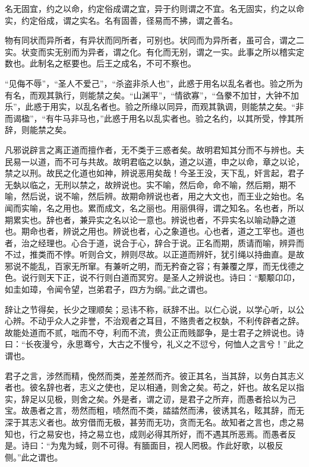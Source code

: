 \documentclass[]{article}
\begin{document}
名无固宜，约之以命，约定俗成谓之宜，异于约则谓之不宜。名无固实，约之以命实，约定俗成，谓之实名。名有固善，径易而不拂，谓之善名。

物有同状而异所者，有异状而同所者，可别也。状同而为异所者，虽可合，谓之二实。状变而实无别而为异者，谓之化。有化而无别，谓之一实。此事之所以稽实定数也。此制名之枢要也。后王之成名，不可不察也。

``见侮不辱''，``圣人不爱己''，``杀盗非杀人也''，此惑于用名以乱名者也。验之所为有名，而观其孰行，则能禁之矣。``山渊平''，``情欲寡''，``刍豢不加甘，大钟不加乐''，此惑于用实，以乱名者也。验之所缘以同异，而观其孰调，则能禁之矣。``非而谒楹''，``有牛马非马也，''此惑于用名以乱实者也。验之名约，以其所受，悖其所辞，则能禁之矣。

凡邪说辟言之离正道而擅作者，无不类于三惑者矣。故明君知其分而不与辨也。夫民易一以道，而不可与共故。故明君临之以埶，道之以道，申之以命，章之以论，禁之以刑。故民之化道也如神，辨说恶用矣哉！今圣王没，天下乱，奸言起，君子无埶以临之，无刑以禁之，故辨说也。实不喻，然后命，命不喻，然后期，期不喻，然后说，说不喻，然后辨。故期命辨说也者，用之大文也，而王业之始也。名闻而实喻，名之用也。累而成文，名之丽也。用丽俱得，谓之知名。名也者，所以期累实也。辞也者，兼异实之名以论一意也。辨说也者，不异实名以喻动静之道也。期命也者，辨说之用也。辨说也者，心之象道也。心也者，道之工宰也。道也者，治之经理也。心合于道，说合于心，辞合于说。正名而期，质请而喻，辨异而不过，推类而不悖。听则合文，辨则尽故。以正道而辨奸，犹引绳以持曲直。是故邪说不能乱，百家无所窜。有兼听之明，而无矜奋之容；有兼覆之厚，而无伐德之色。说行则天下正，说不行则白道而冥穷。是圣人之辨说也。诗曰：``颙颙卬卬，如圭如璋，令闻令望，岂弟君子，四方为纲。''此之谓也。

辞让之节得矣，长少之理顺矣；忌讳不称，祅辞不出。以仁心说，以学心听，以公心辨。不动乎众人之非誉，不治观者之耳目，不赂贵者之权埶，不利传辟者之辞。故能处道而不贰，咄而不夺，利而不流，贵公正而贱鄙争，是士君子之辨说也。诗曰：``长夜漫兮，永思骞兮，大古之不慢兮，礼义之不愆兮，何恤人之言兮！''此之谓也。

君子之言，涉然而精，俛然而类，差差然而齐。彼正其名，当其辞，以务白其志义者也。彼名辞也者，志义之使也，足以相通，则舍之矣。苟之，奸也。故名足以指实，辞足以见极，则舍之矣。外是者，谓之讱，是君子之所弃，而愚者拾以为己宝。故愚者之言，芴然而粗，啧然而不类，誻誻然而沸，彼诱其名，眩其辞，而无深于其志义者也。故穷借而无极，甚劳而无功，贪而无名。故知者之言也，虑之易知也，行之易安也，持之易立也，成则必得其所好，而不遇其所恶焉。而愚者反是。诗曰：``为鬼为蜮，则不可得。有腼面目，视人罔极。作此好歌，以极反侧。''此之谓也。
\end{document}

